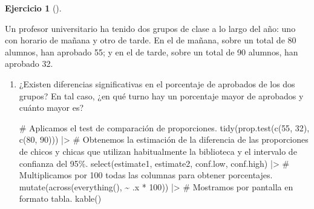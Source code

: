 \documentclass[
  a4paper,
]{scrreport}
\newenvironment{Shaded}{\begin{snugshade}}{\end{snugshade}}
\newcommand{\CommentTok}[1]{\textcolor[rgb]{0.37,0.37,0.37}{#1}}
\newcommand{\DecValTok}[1]{\textcolor[rgb]{0.68,0.00,0.00}{#1}}
\newcommand{\FunctionTok}[1]{\textcolor[rgb]{0.28,0.35,0.67}{#1}}
\newcommand{\NormalTok}[1]{\textcolor[rgb]{0.00,0.23,0.31}{#1}}
\newcommand{\SpecialCharTok}[1]{\textcolor[rgb]{0.37,0.37,0.37}{#1}}
\theoremstyle{definition}
\newtheorem{exercise}{Ejercicio}[chapter]
\theoremstyle{remark}
\begin{document}
\begin{exercise}[]\protect\hypertarget{exr-intervalo-comparacion-proporciones-aprobados}{}\label{exr-intervalo-comparacion-proporciones-aprobados}

Un profesor universitario ha tenido dos grupos de clase a lo largo del
año: uno con horario de mañana y otro de tarde. En el de mañana, sobre
un total de 80 alumnos, han aprobado 55; y en el de tarde, sobre un
total de 90 alumnos, han aprobado 32.

\begin{enumerate}
\def\labelenumi{\alph{enumi}.}
\item
  ¿Existen diferencias significativas en el porcentaje de aprobados de
  los dos grupos? En tal caso, ¿en qué turno hay un porcentaje mayor de
  aprobados y cuánto mayor es?

  \begin{tcolorbox}[enhanced jigsaw, coltitle=black, left=2mm, colback=white, leftrule=.75mm, toptitle=1mm, breakable, bottomrule=.15mm, titlerule=0mm, bottomtitle=1mm, title=\textcolor{quarto-callout-tip-color}{\faLightbulb}\hspace{0.5em}{Solución}, arc=.35mm, toprule=.15mm, rightrule=.15mm, colframe=quarto-callout-tip-color-frame, opacityback=0, colbacktitle=quarto-callout-tip-color!10!white, opacitybacktitle=0.6]

\begin{Shaded}
\begin{Highlighting}[]
\CommentTok{\# Aplicamos el test de comparación de proporciones.}
\FunctionTok{tidy}\NormalTok{(}\FunctionTok{prop.test}\NormalTok{(}\FunctionTok{c}\NormalTok{(}\DecValTok{55}\NormalTok{, }\DecValTok{32}\NormalTok{), }\FunctionTok{c}\NormalTok{(}\DecValTok{80}\NormalTok{, }\DecValTok{90}\NormalTok{))) }\SpecialCharTok{|\textgreater{}} 
\CommentTok{\# Obtenemos la estimación de la diferencia de las proporciones de chicos y chicas que utilizan habitualmente la biblioteca y el intervalo de confianza del 95\%.}
    \FunctionTok{select}\NormalTok{(estimate1, estimate2, conf.low, conf.high) }\SpecialCharTok{|\textgreater{}} 
    \CommentTok{\# Multiplicamos por 100 todas las columnas para obtener porcentajes.}
    \FunctionTok{mutate}\NormalTok{(}\FunctionTok{across}\NormalTok{(}\FunctionTok{everything}\NormalTok{(), }\SpecialCharTok{\textasciitilde{}}\NormalTok{ .x }\SpecialCharTok{*} \DecValTok{100}\NormalTok{)) }\SpecialCharTok{|\textgreater{}} 
    \CommentTok{\# Mostramos por pantalla en formato tabla.}
    \FunctionTok{kable}\NormalTok{()}
\end{Highlighting}
\end{Shaded}


\end{tcolorbox}
\end{enumerate}
\end{exercise}
\end{document}
